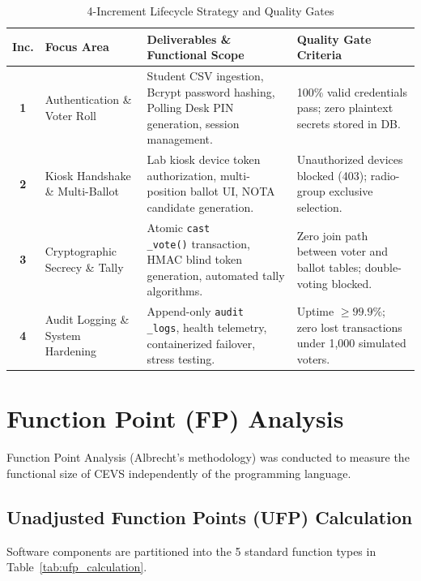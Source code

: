 \documentclass[12pt,a4paper,oneside]{report}
\begin{document}
\begin{table}[H]
    \centering
    \caption{4-Increment Lifecycle Strategy and Quality Gates}
    \label{tab:increment_breakdown}
    \begin{tabularx}{\textwidth}{c p{3.2cm} X p{3.5cm}}
        \toprule
        \textbf{Inc.} & \textbf{Focus Area} & \textbf{Deliverables \& Functional Scope} & \textbf{Quality Gate Criteria} \\
        \midrule
        \textbf{1} & Authentication \& Voter Roll & Student CSV ingestion, Bcrypt password hashing, Polling Desk PIN generation, session management. & 100\% valid credentials pass; zero plaintext secrets stored in DB. \\
        \textbf{2} & Kiosk Handshake \& Multi-Ballot & Lab kiosk device token authorization, multi-position ballot UI, NOTA candidate generation. & Unauthorized devices blocked (403); radio-group exclusive selection. \\
        \textbf{3} & Cryptographic Secrecy \& Tally & Atomic \texttt{cast\\_vote()} transaction, HMAC blind token generation, automated tally algorithms. & Zero join path between voter and ballot tables; double-voting blocked. \\
        \textbf{4} & Audit Logging \& System Hardening & Append-only \texttt{audit\\_logs}, health telemetry, containerized failover, stress testing. & Uptime $\ge 99.9\%$; zero lost transactions under 1,000 simulated voters. \\
        \bottomrule
    \end{tabularx}
\end{table}

\section{Function Point (FP) Analysis}
Function Point Analysis (Albrecht's methodology) was conducted to measure the functional size of CEVS independently of the programming language.

\subsection{Unadjusted Function Points (UFP) Calculation}
Software components are partitioned into the 5 standard function types in Table~\ref{tab:ufp_calculation}.
\end{document}

